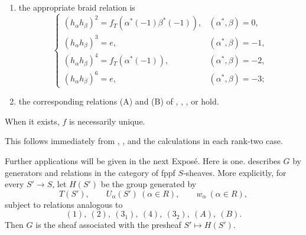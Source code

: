 {\begin{enumerate}
    \begin{enumerate}
      \item[(a)] the appropriate braid relation is
        \begin{equation}
        \tag{\(3_2\)}\label{sga3:xxiii:theorem:3-5-1:equation:3-2}
        \begin{cases}
        (h_\alpha h_\beta)^2
          =f_T(\alpha^*(-1)\beta^*(-1)),
          &(\alpha^*,\beta)=0,\\
        (h_\alpha h_\beta)^3=e,
          &(\alpha^*,\beta)=-1,\\
        (h_\alpha h_\beta)^4=f_T(\alpha^*(-1)),
          &(\alpha^*,\beta)=-2,\\
        (h_\alpha h_\beta)^6=e,
          &(\alpha^*,\beta)=-3;
        \end{cases}
        \end{equation}
      \item[(b)] the corresponding relations (A) and (B) of
        , , , or  hold.
    \end{enumerate}
\end{enumerate}
When it exists, \(f\) is necessarily unique.}

This follows immediately from , , and the
calculations in each rank-two case.


Further applications will be given in the next Exposé. Here is one.
 describes \(G\) by generators and relations in the
category of fppf \(S\)-sheaves. More explicitly, for every
\(S'\to S\), let \(H(S')\) be the group generated by
\[
  T(S'),\qquad U_\alpha(S')\ (\alpha\in R),\qquad
  w_\alpha\ (\alpha\in R),
\]
subject to relations analogous to
\[
  (1),\ (2),\ (3_1),\ (4),\ (3_2),\ (A),\ (B).
\]
Then \(G\) is the sheaf associated with the presheaf
\(S'\mapsto H(S')\).

